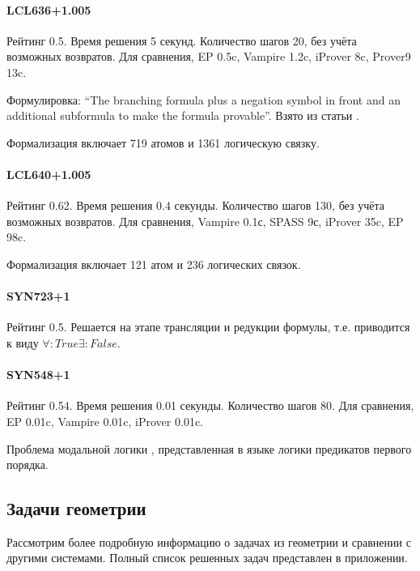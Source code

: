 \paragraph{LCL636+1.005}
Рейтинг 0.5. Время решения 5 секунд. Количество шагов 20, без учёта возможных возвратов. Для сравнения, EP 0.5c, Vampire 1.2c, iProver 8c, Prover9 13c.

Формулировка: ``The branching formula plus a negation symbol in front and an additional subformula to make the formula provable''.
Взято из статьи \cite{SourceLCL}.

Формализация включает 719 атомов и 1361 логическую связку.


\paragraph{LCL640+1.005}
Рейтинг 0.62. Время решения 0.4 секунды. Количество шагов 130, без учёта возможных возвратов. Для сравнения, Vampire 0.1с, SPASS 9с, iProver 35c, EP 98c.

Формализация включает 121 атом и 236 логических связок.

\paragraph{SYN723+1}
Рейтинг 0.5. Решается на этапе трансляции и редукции формулы, т.е. приводится к виду $\forall: True \exists: False$.

\paragraph{SYN548+1}
Рейтинг 0.54. Время решения 0.01 секунды. Количество шагов 80. Для сравнения, EP 0.01c, Vampire 0.01c, iProver 0.01c.

Проблема модальной логики \cite{chellas}, представленная в языке логики предикатов первого порядка.

\subsection{Задачи геометрии}
Рассмотрим более подробную информацию о задачах из геометрии и сравнении с другими системами. Полный список решенных задач представлен в приложении.

